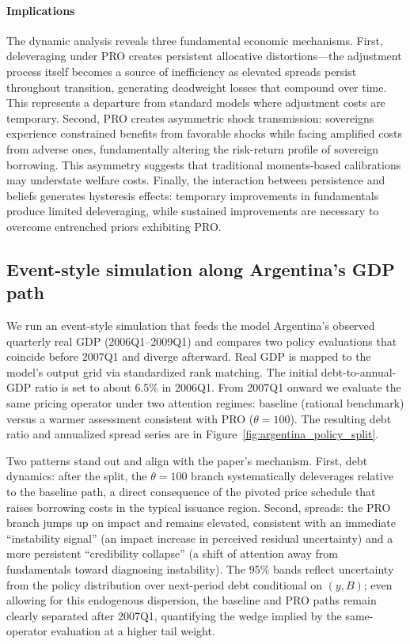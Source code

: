 \documentclass[12pt]{article}
\theoremstyle{plain}
\begin{document}
\paragraph{Implications}

The dynamic analysis reveals three fundamental economic mechanisms. First,
deleveraging under PRO creates persistent allocative distortions—the adjustment
process itself becomes a source of inefficiency as elevated spreads persist
throughout transition, generating deadweight losses that compound over time.
This represents a departure from standard models where adjustment costs are
temporary. Second, PRO creates asymmetric shock transmission: sovereigns
experience constrained benefits from favorable shocks while facing amplified
costs from adverse ones, fundamentally altering the risk-return profile of
sovereign borrowing. This asymmetry suggests that traditional moments-based
calibrations may understate welfare costs. Finally, the interaction between
persistence and beliefs generates hysteresis effects: temporary improvements in
fundamentals produce limited deleveraging, while sustained improvements are
necessary to overcome entrenched priors exhibiting PRO.

\subsection{Event-style simulation along Argentina's GDP path}\label{sec:argentina_policy_split}
We run an event-style simulation that feeds the model Argentina’s observed
quarterly real GDP (2006Q1–2009Q1) and compares two policy evaluations that
coincide before 2007Q1 and diverge afterward. Real GDP is mapped to the model’s
output grid via standardized rank matching. The initial debt-to-annual-GDP
ratio is set to about 6.5\% in 2006Q1. From 2007Q1 onward we evaluate the same
pricing operator under two attention regimes: baseline (rational benchmark)
versus a warmer assessment consistent with PRO ($\theta=100$). The resulting
debt ratio and annualized spread series are in
Figure~\ref{fig:argentina_policy_split}.

Two patterns stand out and align with the paper’s mechanism. First, debt
dynamics: after the split, the $\theta=100$ branch systematically deleverages
relative to the baseline path, a direct consequence of the pivoted price
schedule that raises borrowing costs in the typical issuance region. Second,
spreads: the PRO branch jumps up on impact and remains elevated, consistent
with an immediate ``instability signal'' (an impact increase in perceived
residual uncertainty) and a more persistent ``credibility collapse'' (a shift
of attention away from fundamentals toward diagnosing instability). The 95\%
bands reflect uncertainty from the policy distribution over next-period debt
conditional on $(y,B)$; even allowing for this endogenous dispersion, the
baseline and PRO paths remain clearly separated after 2007Q1, quantifying the
wedge implied by the same-operator evaluation at a higher tail weight.
\end{document}
